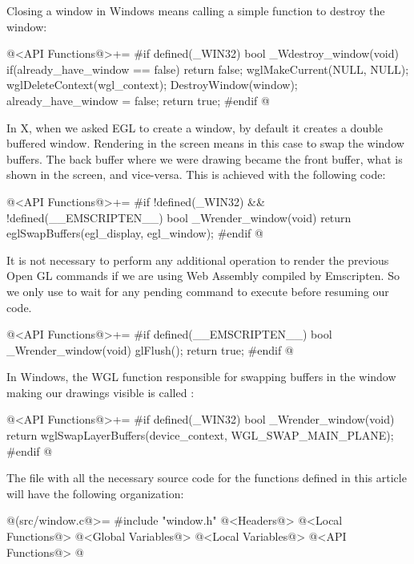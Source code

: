 
Closing a window in Windows means calling a simple function to destroy
the window:

\iniciocodigo
@<API Functions@>+=
#if defined(_WIN32)
bool _Wdestroy_window(void){
  if(already_have_window == false)
    return false;
  wglMakeCurrent(NULL, NULL);
  wglDeleteContext(wgl_context);
  DestroyWindow(window);
  already_have_window = false;
  return true;
}
#endif
@
\fimcodigo


In X, when we asked EGL to create a window, by default it creates a
double buffered window. Rendering in the screen means in this case to
swap the window buffers. The back buffer where we were drawing became
the front buffer, what is shown in the screen, and vice-versa. This is
achieved with the following code:

\iniciocodigo
@<API Functions@>+=
#if !defined(_WIN32) && !defined(__EMSCRIPTEN__)
bool _Wrender_window(void){
  return eglSwapBuffers(egl_display, egl_window);
}
#endif
@
\fimcodigo


It is not necessary to perform any additional operation to render the
previous Open GL commands if we are using Web Assembly compiled by
Emscripten. So we only use  to wait for any
pending command to execute before resuming our code.

\iniciocodigo
@<API Functions@>+=
#if defined(__EMSCRIPTEN__)
bool _Wrender_window(void){
  glFlush();
  return true;
}
#endif
@
\fimcodigo


In Windows, the WGL function responsible for swapping buffers in the
window making our drawings visible is
called :

\iniciocodigo
@<API Functions@>+=
#if defined(_WIN32)
bool _Wrender_window(void){
  return wglSwapLayerBuffers(device_context, WGL_SWAP_MAIN_PLANE);
}
#endif
@
\fimcodigo




The file with all the necessary source code for the functions defined
in this article will have the following organization:

\iniciocodigo
@(src/window.c@>=
#include "window.h"
@<Headers@>
@<Local Functions@>
@<Global Variables@>
@<Local Variables@>
@<API Functions@>
@
\fimcodigo


\fim
